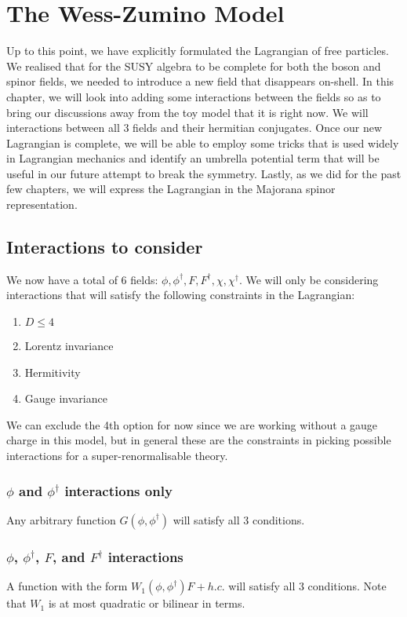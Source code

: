 \chapter{The Wess-Zumino Model}
\label{ch:8}

Up to this point, we have explicitly formulated the Lagrangian of free particles. We realised that for the SUSY algebra to be complete for both the boson and spinor fields, we needed to introduce a new field that disappears on-shell. In this chapter, we will look into adding some interactions between the fields so as to bring our discussions away from the toy model that it is right now. We will interactions between all 3 fields and their hermitian conjugates. Once our new Lagrangian is complete, we will be able to employ some tricks that is used widely in Lagrangian mechanics and identify an umbrella potential term that will be useful in our future attempt to break the symmetry. Lastly, as we did for the past few chapters, we will express the Lagrangian in the Majorana spinor representation.

\section{Interactions to consider}
\label{ch:8:interactions to consider}
We now have a total of 6 fields: $\phi, \phi^\dagger, F, F^\dagger, \chi, \chi^\dagger$. We will only be considering interactions that will satisfy the following constraints in the Lagrangian:
\begin{enumerate}
    \item $D\leq4$
    \item Lorentz invariance
    \item Hermitivity
    \item Gauge invariance
\end{enumerate}

We can exclude the 4th option for now since we are working without a gauge charge in this model, but in general these are the constraints in picking possible interactions for a super-renormalisable theory.

\subsection{$\phi$ and $\phi^\dagger$ interactions only}
Any arbitrary function $G(\phi, \phi^\dagger)$ will satisfy all 3 conditions.

\subsection{$\phi$, $\phi^\dagger$, $F$, and $F^\dagger$ interactions}
A function with the form $W_1(\phi, \phi^\dagger) F + h.c.$ will satisfy all 3 conditions. Note that $W_1$ is at most quadratic or bilinear in terms.

